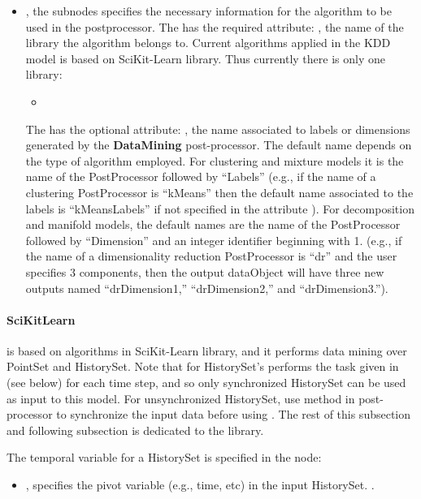 \begin{itemize}
  \item {} , the subnodes specifies
  the necessary information for the algorithm to be used in the postprocessor.
  The  has the required attribute: , the name of the
  library the algorithm belongs to. Current algorithms applied in the KDD model
  is based on SciKit-Learn library. Thus currently there is only one library:
  \begin{itemize}
    \item {}
  \end{itemize}
  The  has the optional attribute: , the name
  associated to labels or dimensions generated by the \textbf{DataMining}
  post-processor.
  The default name depends on the type of algorithm employed.
  For clustering and mixture models it is the name of the PostProcessor
  followed by ``Labels'' (e.g., if the name of a clustering PostProcessor is
  ``kMeans'' then the default name associated to the labels is ``kMeansLabels''
  if not specified in the attribute ).
  For decomposition and manifold models, the default names are the name of the
  PostProcessor followed by ``Dimension'' and an integer identifier beginning
  with 1. (e.g., if the name of a dimensionality reduction PostProcessor is
  ``dr'' and the user specifies 3 components, then the output dataObject will
  have three new outputs named ``drDimension1,'' ``drDimension2,'' and
  ``drDimension3.'').
\end{itemize}

\paragraph{SciKitLearn}
 is based on algorithms in SciKit-Learn library, and it performs data mining over PointSet and HistorySet. Note that for HistorySet's  performs the task given in  (see below) for each time step, and so only synchronized HistorySet can be used as input to this model. For unsynchronized HistorySet, use  method in  post-processor to synchronize the input data before using . The rest of this subsection and following subsection is dedicated to the  library.

The temporal variable for a HistorySet  is specified in the  node:
\begin{itemize}
  \item {},  specifies the pivot variable (e.g., time, etc) in the input HistorySet.
      .
\end{itemize}

